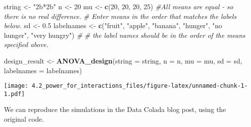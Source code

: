 \documentclass[]{article}
\newenvironment{Shaded}{\begin{snugshade}}{\end{snugshade}}
\newcommand{\KeywordTok}[1]{\textcolor[rgb]{0.13,0.29,0.53}{\textbf{#1}}}
\newcommand{\DataTypeTok}[1]{\textcolor[rgb]{0.13,0.29,0.53}{#1}}
\newcommand{\DecValTok}[1]{\textcolor[rgb]{0.00,0.00,0.81}{#1}}
\newcommand{\FloatTok}[1]{\textcolor[rgb]{0.00,0.00,0.81}{#1}}
\newcommand{\StringTok}[1]{\textcolor[rgb]{0.31,0.60,0.02}{#1}}
\newcommand{\CommentTok}[1]{\textcolor[rgb]{0.56,0.35,0.01}{\textit{#1}}}
\newcommand{\NormalTok}[1]{#1}
\begin{document}
\begin{Shaded}
\begin{Highlighting}[]
\NormalTok{string <-}\StringTok{ "2b*2b"}
\NormalTok{n <-}\StringTok{ }\DecValTok{20}
\NormalTok{mu <-}\StringTok{ }\KeywordTok{c}\NormalTok{(}\DecValTok{20}\NormalTok{, }\DecValTok{20}\NormalTok{, }\DecValTok{20}\NormalTok{, }\DecValTok{25}\NormalTok{) }\CommentTok{#All means are equal - so there is no real difference.}
\CommentTok{# Enter means in the order that matches the labels below.}
\NormalTok{sd <-}\StringTok{ }\FloatTok{0.5}
\NormalTok{labelnames <-}\StringTok{ }\KeywordTok{c}\NormalTok{(}\StringTok{"fruit"}\NormalTok{, }\StringTok{"apple"}\NormalTok{, }\StringTok{"banana"}\NormalTok{, }\StringTok{"hunger"}\NormalTok{, }\StringTok{"no hunger"}\NormalTok{, }\StringTok{"very hungry"}\NormalTok{) }\CommentTok{#}
\CommentTok{# the label names should be in the order of the means specified above.}

\NormalTok{design_result <-}\StringTok{ }\KeywordTok{ANOVA_design}\NormalTok{(}\DataTypeTok{string =}\NormalTok{ string,}
                   \DataTypeTok{n =}\NormalTok{ n, }
                   \DataTypeTok{mu =}\NormalTok{ mu, }
                   \DataTypeTok{sd =}\NormalTok{ sd, }
                   \DataTypeTok{labelnames =}\NormalTok{ labelnames)}
\end{Highlighting}
\end{Shaded}

\texttt{[image: 4.2\_power\_for\_interactions\_files/figure-latex/unnamed-chunk-1-1.pdf]}

We can reproduce the simulations in the Data Colada blog post, using the
original code.
\end{document}
